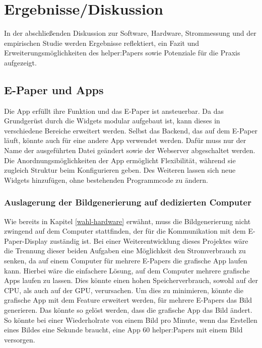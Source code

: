 \documentclass[10pt]{article}
\begin{document}
\section{Ergebnisse/Diskussion}
 In der abschließenden Diskussion zur Software, Hardware, Strommessung und der empirischen Studie werden Ergebnisse reflektiert, ein Fazit und Erweiterungsmöglichkeiten des helper:Papers sowie Potenziale für die Praxis aufgezeigt.


\subsection{E-Paper und Apps}
Die App erfüllt ihre Funktion und das E-Paper ist ansteuerbar. Da das Grundgerüst durch die Widgets modular aufgebaut ist, kann dieses in verschiedene Bereiche erweitert werden. Selbst das Backend, das auf dem E-Paper läuft, könnte auch für eine andere App verwendet werden. Dafür muss nur der Name der ausgeführten Datei geändert sowie der Webserver abgeschaltet werden. Die Anordnungsmöglichkeiten der App ermöglicht Flexibilität, während sie zugleich Struktur beim Konfigurieren geben. Des Weiteren lassen sich neue Widgets hinzufügen, ohne bestehenden Programmcode zu ändern.

\subsubsection{Auslagerung der Bildgenerierung auf dedizierten Computer}
Wie bereits in Kapitel \ref{wahl-hardware} erwähnt, muss die Bildgenerierung nicht zwingend auf dem Computer stattfinden, der für die Kommunikation mit dem E-Paper-Display zuständig ist. Bei einer Weiterentwicklung dieses Projektes wäre die Trennung dieser beiden Aufgaben eine Möglichkeit den Stromverbrauch zu senken, da auf einem Computer für mehrere E-Papers die grafische App laufen kann. Hierbei wäre die einfachere Lösung, auf dem Computer mehrere grafische Apps laufen zu lassen. Dies könnte einen hohen Speicherverbrauch, sowohl auf der CPU, als auch auf der GPU, verursachen. Um dies zu minimieren, könnte die grafische App mit dem Feature erweitert werden, für mehrere E-Papers das Bild generieren. Das könnte so gelöst werden, dass die grafische App das Bild ändert. So könnte bei einer Wiederholrate von einem Bild pro Minute, wenn das Erstellen eines Bildes eine Sekunde braucht, eine App 60 helper:Papers mit einem Bild versorgen.
\end{document}
